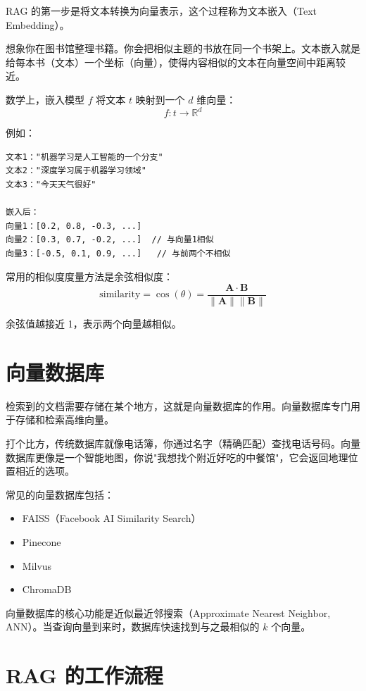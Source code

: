 RAG 的第一步是将文本转换为向量表示，这个过程称为文本嵌入（Text Embedding）。

想象你在图书馆整理书籍。你会把相似主题的书放在同一个书架上。文本嵌入就是给每本书（文本）一个坐标（向量），使得内容相似的文本在向量空间中距离较近。

数学上，嵌入模型 $f$ 将文本 $t$ 映射到一个 $d$ 维向量：
\begin{equation*}
    f: t \rightarrow \mathbb{R}^d
\end{equation*}

例如：
\begin{verbatim}
文本1："机器学习是人工智能的一个分支"
文本2："深度学习属于机器学习领域"
文本3："今天天气很好"

嵌入后：
向量1：[0.2, 0.8, -0.3, ...]
向量2：[0.3, 0.7, -0.2, ...]  // 与向量1相似
向量3：[-0.5, 0.1, 0.9, ...]   // 与前两个不相似
\end{verbatim}

常用的相似度度量方法是余弦相似度：
\begin{equation*}
    \text{similarity} = \cos(\theta) = \frac{\mathbf{A} \cdot \mathbf{B}}{\|\mathbf{A}\| \|\mathbf{B}\|}
\end{equation*}

余弦值越接近 1，表示两个向量越相似。

\section{向量数据库}

检索到的文档需要存储在某个地方，这就是向量数据库的作用。向量数据库专门用于存储和检索高维向量。

打个比方，传统数据库就像电话簿，你通过名字（精确匹配）查找电话号码。向量数据库更像是一个智能地图，你说"我想找个附近好吃的中餐馆"，它会返回地理位置相近的选项。

常见的向量数据库包括：
\begin{itemize}
    \item FAISS（Facebook AI Similarity Search）
    \item Pinecone
    \item Milvus
    \item ChromaDB
\end{itemize}

向量数据库的核心功能是近似最近邻搜索（Approximate Nearest Neighbor, ANN）。当查询向量到来时，数据库快速找到与之最相似的 $k$ 个向量。

\section{RAG 的工作流程}

